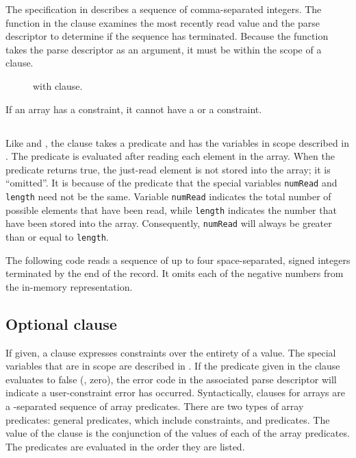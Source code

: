 The specification in  describes a sequence of
comma-separated 
integers.  The  function in the \Pended{} clause examines
the most recently read value and the parse descriptor to determine if
the sequence has terminated.  Because the function takes the parse
descriptor as an argument, it must be within the scope of a
\Pparsecheck{} clause.

\begin{figure}

\caption{\Parray{} with \Pomit{} clause.}
\label{fig:array-ended}
\end{figure}

If an array has a \Pended{} constraint, it cannot have a
\Plast{} or a \Plongest{} constraint.

\subsection{\Pomit}
Like \Plast{} and \Pended{}, the \Pomit{} clause takes a predicate and
has the variables in scope described in
. 
The predicate is evaluated after reading each element in the array.
When the predicate returns true, the just-read element is not stored
into the array;  it is ``omitted''.  It is because of the \Pomit{}
predicate that the special variables \texttt{numRead} and
\texttt{length} need not be the same.  Variable \texttt{numRead}
indicates the total number of possible elements that have been read,
while \texttt{length} indicates the number that have been stored into
the array.  Consequently, \texttt{numRead} will always be greater than
or equal to \texttt{length}.  


The following code reads a sequence of up to four
space-separated, signed 
integers terminated by the end of the record.  It omits each of the
negative numbers from the in-memory representation.


\subsection{Optional \Pwhere{} clause}
If given, a \Pwhere{} clause expresses constraints over the entirety
of a \Parray{} value. The special variables that are in scope are
described in .
If the predicate given in
the \Pwhere{} clause evaluates to false (\ie{}, zero), the error code
in the associated parse descriptor will indicate a user-constraint
error has occurred.   Syntactically,  \Pwhere{} clauses for arrays are
a \cd{\&\&}-separated sequence of array predicates.   There are two types of
array predicates: general predicates, which include \Pparsecheck{}
constraints, and  
\Pforall{} predicates.  The value of the \Pwhere{} clause is the
conjunction of the values of each of the array predicates.  The
predicates are evaluated in the order they are listed.

